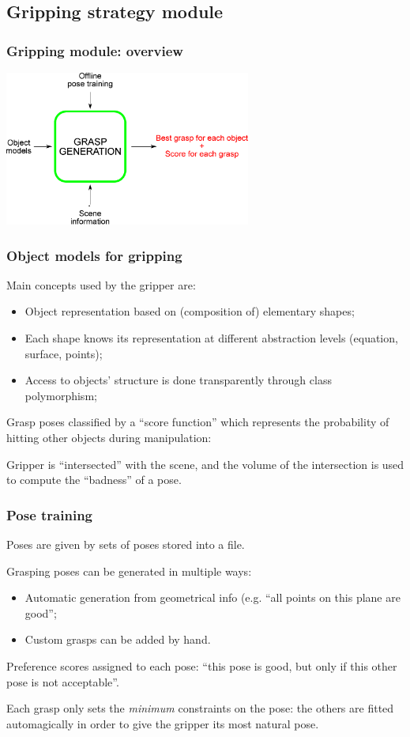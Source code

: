 \documentclass{beamer}
\begin{document}
  \subsection{Gripping strategy module}
  \begin{frame}
    \frametitle{Gripping module: overview}
    \center\includegraphics[height=2in]{grasp}
  \end{frame}
  \begin{frame}
    \frametitle{Object models for gripping}
    Main concepts used by the gripper are:
    \begin{itemize}
    \item{Object representation based on (composition of) elementary
      shapes;}
    \item{Each shape knows its representation at different abstraction levels (equation,
      surface, points);}
    \item{Access to objects' structure is done transparently
      through class polymorphism;}
    \end{itemize}

    \pause
    Grasp poses classified by a ``score function'' which
      represents the probability of hitting other objects during
      manipulation:

      \alert{Gripper is ``intersected'' with the scene, and the
        volume of the intersection is used to compute the
        ``badness'' of a pose.}
  \end{frame}

  \begin{frame}
    \frametitle{Pose training}
    Poses are given by sets of poses stored into a file.
    
    Grasping poses can be generated in multiple ways:
    \begin{itemize}
    \item{Automatic generation from geometrical info (e.g. ``all
      points on this plane are good'';}
    \item{Custom grasps can be added by hand.}
    \end{itemize}
      
    Preference scores assigned to each pose: ``this pose is good, but
    only if this other pose is not acceptable''.
    
    \pause
    
   \alert{Each grasp only sets the \emph{minimum} constraints on the pose:
    the others are fitted automagically in order to give the gripper
    its most natural pose.}
  \end{frame}
\end{document}
